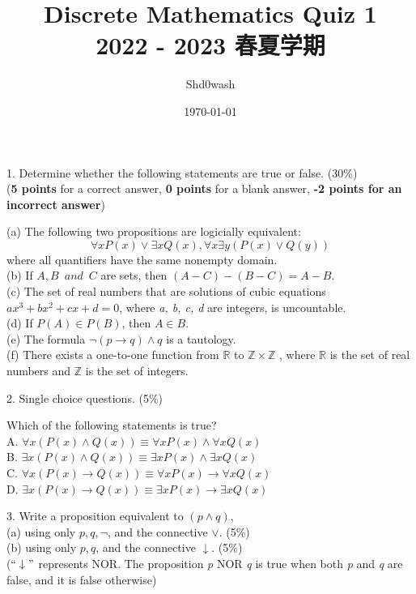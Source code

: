 \documentclass{article}
\title{Discrete Mathematics Quiz 1\\\small{2022 - 2023 春夏学期}}
\author{Shd0wash}
\date{\today}
\begin{document}
\maketitle

1. Determine whether the following statements are true or false. (30\%)\\
(\textbf{5 points} for a correct answer, \textbf{0 points} for a blank answer, \textbf{-2 points for an incorrect answer})  

(a) The following two  propositions are logicially equivalent:  
\[\forall x P(x) \vee \exists x Q(x), \forall x \exists y (P(x) \vee Q(y))\]
where all quantifiers have the same nonempty domain.\\
(b) If $\mathit{A}, \mathit{B}\enspace and \enspace \mathit{C}$ are sets, then $(A - C) - (B - C) = A - B$.\\
(c) The set of real numbers that are solutions of cubic equations $ax^{3} + bx^{2} + cx + d = 0$, where \textit{a, b, c, d} are integers, is uncountable.\\
(d) If $P(A)\in P(B)$, then $A\in B$.\\
(e) The formula $\neg (p\rightarrow q) \wedge q$ is a tautology.\\
(f) There exists a one-to-one function from $\mathbb{R}$ to $\mathbb{Z} \times  \mathbb{Z}$ , where $\mathbb{R}$ is the set of real numbers and $\mathbb{Z}$ is the set of integers.

2. Single choice questions. (5\%)

Which of the following statements is true?\\
A. $\forall x(P(x) \wedge Q(x)) \equiv \forall x P(x) \wedge \forall x Q(x)$\\
B. $\exists x(P(x) \wedge Q(x)) \equiv \exists x P(x) \wedge \exists x Q(x)$\\
C. $\forall x(P(x) \rightarrow Q(x)) \equiv \forall x P(x) \rightarrow \forall x Q(x)$\\
D. $\exists x(P(x) \rightarrow Q(x)) \equiv \exists x P(x) \rightarrow \exists x Q(x)$

3. Write a proposition equivalent to $(p \wedge q)$,\\
(a) using only $p, q, \neg $, and the connective $\vee$. (5\%)\\
(b) using only $p, q$, and the connective $\downarrow$. (5\%)\\
($``\downarrow"$ represents NOR. The proposition \textit{p} NOR \textit{q} is true when both \textit{p} and \textit{q} are false, and it is false otherwise)  
\end{document}
